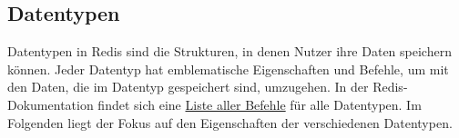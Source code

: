 
\subsection{Datentypen}
\label{subsec:datentypen}

Datentypen in \ac{Redis} sind die Strukturen, in denen Nutzer ihre Daten speichern können. Jeder Datentyp hat emblematische Eigenschaften und Befehle, um mit den Daten, die im Datentyp gespeichert sind, umzugehen. In der \ac{Redis}-Dokumentation findet sich eine \href{https://redis.io/commands}{Liste aller Befehle} für alle Datentypen. Im Folgenden liegt der Fokus auf den Eigenschaften der verschiedenen Datentypen. 